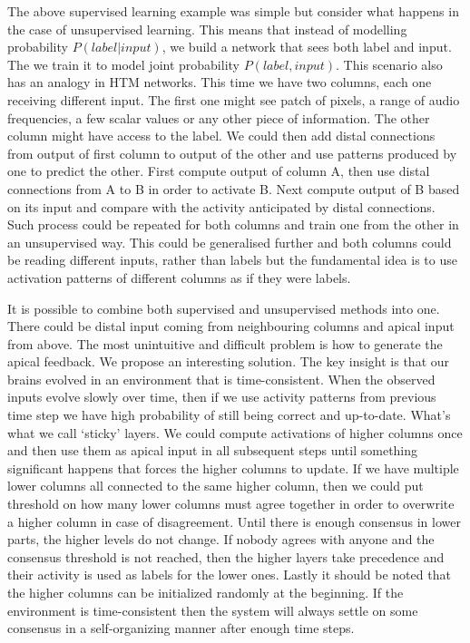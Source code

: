 \documentclass[12pt]{article}
\begin{document}
The above supervised learning example was simple but consider what happens in the case of unsupervised learning. This means that instead of modelling probability $P(label|input)$, we build a network that sees both label and input. The we train it to model joint probability $P(label, input)$. This scenario also has an analogy in HTM networks. This time we have two columns, each one receiving different input. The first one might see
patch of pixels, a range of audio frequencies, a few scalar values or any other piece of information. The other column might have access to the label. We could then add distal connections from output of first column to output of the other and use patterns produced by one to predict the other. First compute output of column A, then use distal connections from A to B in order to activate B. Next compute output of B based on its input and compare with the activity anticipated by distal connections. Such process could be repeated for both columns and train one from the other in an unsupervised way. This could be generalised further and both columns could be reading different inputs, rather than labels but the fundamental idea is to use activation patterns of different columns as if they were labels.

It is possible to combine both supervised and unsupervised methods into one. There could be distal input coming from neighbouring columns and apical input from above. The most unintuitive and difficult problem is how to generate the apical feedback. We propose an interesting solution. The key insight is that our brains evolved in an environment that is time-consistent. When the observed inputs evolve slowly over time, then if we use activity patterns from previous time step we have high probability of still being correct and up-to-date. What's what we call `sticky' layers. We could compute activations of higher columns once and then use them as apical input in all subsequent steps until something significant happens that forces the higher columns to update. If we have multiple lower columns all connected to the same higher column, then we could put threshold on how many lower columns must agree together in order to overwrite a higher column in case of disagreement. Until there is enough consensus in lower parts, the higher levels do not change. If nobody agrees with anyone and the consensus threshold is not reached, then the higher layers take precedence and their activity is used as labels for the lower ones.
Lastly it should be noted that the higher columns can be initialized randomly at the beginning. If the environment is time-consistent then the system will always settle on some consensus in a self-organizing manner after enough time steps.
\end{document}
